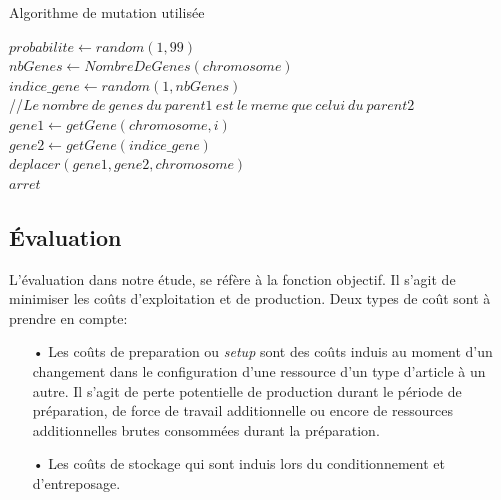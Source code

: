 \documentclass[12pt,a4paper]{article}
\begin{document}
	\begin{algorithm}[H]
 		\caption{Algorithme de mutation utilisée}
 		\label{alg:mutation}
 		\BlankLine
 		$probabilite \gets random(1,99)$ \\
 		\BlankLine
 		{
 			$nbGenes \gets NombreDeGenes(chromosome)$\\
 			$indice\_gene \gets random(1, nbGenes)$\\
 			//$ Le \ nombre \ de \ genes \ du \ parent1 \ est \ le \ meme \ que \ celui \ du \ parent2 $\\
 			{
 				$gene1 \gets getGene(chromosome, i)$ \\
 				{
 					$gene2 \gets getGene(indice\_gene)$\\
 					$deplacer(gene1, gene2, chromosome)$ \\
 					$arret$
 				}
 			}
 		}
		\end{algorithm}
	
	\subsection{Évaluation}
	L'évaluation dans notre étude, se réfère à la fonction objectif. Il s'agit de minimiser les coûts d'exploitation et de production. Deux types de coût sont à prendre en compte:
	\begin{itemize}
		\item[•] Les coûts de preparation ou \emph{setup} sont des coûts induis au moment d'un changement dans le configuration d'une ressource d'un type d'article à un autre. Il s'agit de perte potentielle de production durant le période de préparation, de force de travail additionnelle ou encore de ressources additionnelles brutes consommées durant la préparation.
		\item[•] Les coûts de stockage qui sont induis lors du conditionnement et d’entreposage.
	\end{itemize}
	
\end{document}
